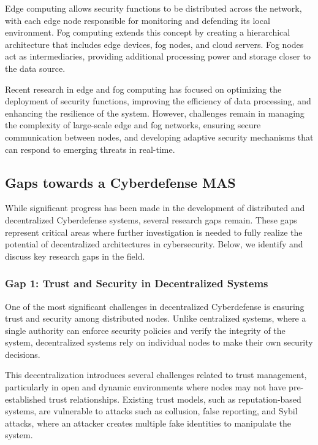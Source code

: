 Edge computing allows security functions to be distributed across the network, with each edge node responsible for monitoring and defending its local environment. Fog computing extends this concept by creating a hierarchical architecture that includes edge devices, fog nodes, and cloud servers. Fog nodes act as intermediaries, providing additional processing power and storage closer to the data source.

Recent research in edge and fog computing has focused on optimizing the deployment of security functions, improving the efficiency of data processing, and enhancing the resilience of the system. However, challenges remain in managing the complexity of large-scale edge and fog networks, ensuring secure communication between nodes, and developing adaptive security mechanisms that can respond to emerging threats in real-time.

\subsection{Gaps towards a Cyberdefense MAS}

While significant progress has been made in the development of distributed and decentralized Cyberdefense systems, several research gaps remain. These gaps represent critical areas where further investigation is needed to fully realize the potential of decentralized architectures in cybersecurity. Below, we identify and discuss key research gaps in the field.

\subsubsection{Gap 1: Trust and Security in Decentralized Systems}

One of the most significant challenges in decentralized Cyberdefense is ensuring trust and security among distributed nodes. Unlike centralized systems, where a single authority can enforce security policies and verify the integrity of the system, decentralized systems rely on individual nodes to make their own security decisions.

This decentralization introduces several challenges related to trust management, particularly in open and dynamic environments where nodes may not have pre-established trust relationships. Existing trust models, such as reputation-based systems, are vulnerable to attacks such as collusion, false reporting, and Sybil attacks, where an attacker creates multiple fake identities to manipulate the system.

